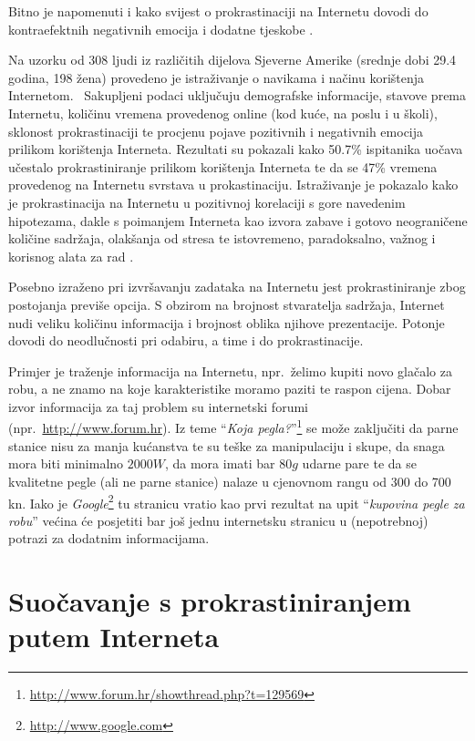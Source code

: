 \documentclass[11pt,twocolumn,english]{article}
\begin{document}
Bitno je napomenuti i kako svijest o prokrastinaciji na Internetu dovodi do kontraefektnih negativnih 
emocija i dodatne tjeskobe \cite{Kraut98internet}.

Na uzorku od 308 ljudi iz različitih dijelova Sjeverne Amerike (srednje dobi 29.4 godina, 198 žena)
provedeno je istraživanje o navikama i načinu korištenja Internetom.~ Sakupljeni
podaci uključuju demografske informacije, stavove prema Internetu, količinu vremena
provedenog online (kod kuće, na poslu i u školi), sklonost prokrastinaciji te procjenu
pojave pozitivnih i negativnih emocija prilikom korištenja Interneta. 
Rezultati su pokazali kako 50.7\% ispitanika uočava učestalo prokrastiniranje prilikom
korištenja Interneta te da se 47\% vremena provedenog na Internetu svrstava u prokastinaciju.
Istraživanje je pokazalo kako je prokrastinacija na Internetu u pozitivnoj korelaciji s gore navedenim 
hipotezama, dakle s poimanjem Interneta kao izvora zabave i gotovo neograničene količine sadržaja, olakšanja 
od stresa te istovremeno, paradoksalno, važnog i korisnog alata za rad
\cite{Lavoie01cyberslacking}.

Posebno izraženo pri izvršavanju zadataka na Internetu jest prokrastiniranje zbog 
postojanja previše opcija. S obzirom na brojnost stvaratelja sadržaja, Internet
nudi veliku količinu informacija i brojnost oblika njihove prezentacije. Potonje dovodi 
do neodlučnosti pri odabiru, a time i do prokrastinacije.

Primjer je traženje informacija na Internetu, npr.~želimo kupiti novo glačalo
za robu, a ne znamo na koje karakteristike moramo paziti te raspon cijena. 
Dobar izvor informacija za taj problem su internetski forumi
(npr.~\url{http://www.forum.hr}). Iz teme ``\emph{Koja pegla?}''\footnote{\url{http://www.forum.hr/showthread.php?t=129569}}
se može zaključiti da parne stanice nisu za manja kućanstva te su teške za
manipulaciju i skupe, da snaga mora biti minimalno $2000 W$, da mora
imati bar $80 g$ udarne pare te da se kvalitetne pegle (ali ne parne stanice)
nalaze u cjenovnom rangu od 300 do 700 kn. Iako je
\emph{Google}\footnote{\url{http://www.google.com}} tu stranicu vratio kao prvi
rezultat na upit ``\emph{kupovina pegle za robu}'' većina će posjetiti bar još
jednu internetsku stranicu u (nepotrebnoj) potrazi za dodatnim informacijama.


\section{Suočavanje s prokrastiniranjem putem Interneta}
\end{document}
